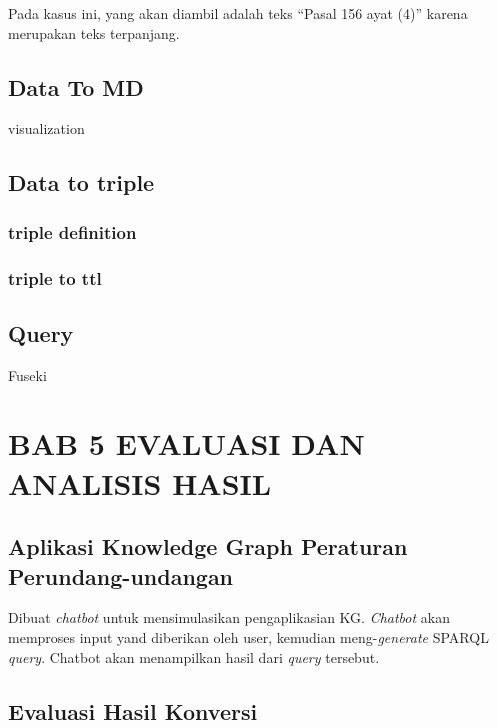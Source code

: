 Pada kasus ini, yang akan diambil adalah teks ``Pasal 156 ayat (4)''
karena merupakan teks terpanjang.

\subsection{Data To MD}\label{data-to-md}

visualization

\subsection{Data to triple}\label{data-to-triple}

\subsubsection{triple definition}\label{triple-definition}

\subsubsection{triple to ttl}\label{triple-to-ttl}

\subsection{Query}\label{query}

Fuseki

\section{BAB 5 EVALUASI DAN ANALISIS
HASIL}\label{bab-5-evaluasi-dan-analisis-hasil}

\subsection{Aplikasi Knowledge Graph Peraturan
Perundang-undangan}\label{aplikasi-knowledge-graph-peraturan-perundang-undangan}

Dibuat \emph{chatbot} untuk mensimulasikan pengaplikasian KG.
\emph{Chatbot} akan memproses input yand diberikan oleh user, kemudian
meng-\emph{generate} SPARQL \emph{query}. Chatbot akan menampilkan hasil
dari \emph{query} tersebut.

\subsection{Evaluasi Hasil Konversi}\label{evaluasi-hasil-konversi}

